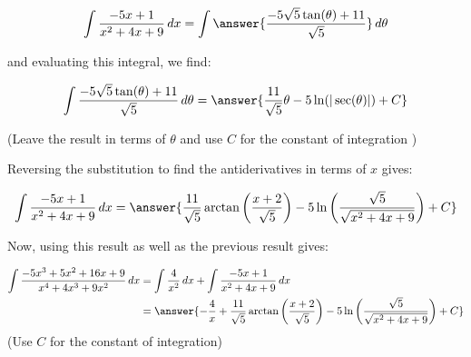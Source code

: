 \documentclass{ximera}
\begin{document}
\begin{exercise}
\begin{exercise}
\begin{exercise}
\begin{exercise}
\[
\int \frac{-5x+1}{x^{2}+4x+9} \d x =\int   \answer{\frac{-5\sqrt{5}\tan(\theta)+11}{\sqrt{5}}}  \d \theta
\]

and evaluating this integral, we find:


\[
\int   \frac{-5\sqrt{5}\tan(\theta)+11}{\sqrt{5}}  \d \theta = \answer{\frac{11}{\sqrt{5}}\theta -5\ln(|\sec(\theta)|)+C}
\]

(Leave the result in terms of $\theta$ and use $C$ for the constant of integration )

\begin{exercise}

Reversing the substitution to find the antiderivatives in terms of $x$ gives:

\[\int \frac{-5x+1}{x^{2}+4x+9} \d x =\answer{\frac{11}{\sqrt{5}}\arctan\left(\frac{x+2}{\sqrt{5}}\right)
- 5\ln\left(\frac{\sqrt{5}}{\sqrt{x^{2}+4x+9}}\right) + C}
\]

Now, using this result as well as the previous result gives:

\begin{align*}
\int \frac{-5x^{3}+5x^{2}+16x+9}{x^{4}+4x^{3}+9x^{2}} \d x &= \int \frac{4}{x^{2}} \d x + \int \frac{-5x+1}{x^{2}+4x+9} \d x \\
&=\answer{-\frac{4}{x}+\frac{11}{\sqrt{5}}\arctan\left(\frac{x+2}{\sqrt{5}}\right) - 5\ln\left(\frac{\sqrt{5}}{\sqrt{x^{2}+4x+9}}\right) + C}
\end{align*}
(Use $C$ for the constant of integration)
 

\end{exercise}
\end{exercise}
\end{exercise}
\end{exercise}
\end{exercise}
\end{document}
